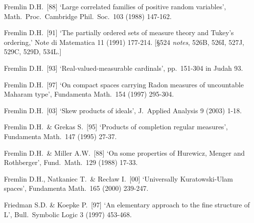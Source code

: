{Fremlin D.H.\ [88] `Large correlated families of positive
random variables',
Math.\ Proc.\ Cambridge Phil.\ Soc.\ 103 (1988) 147-162.
\cmmnt{[525S.]}

Fremlin D.H.\ [91] `The partially ordered sets of measure
theory and Tukey's ordering,' Note di Matematica  11 (1991) 177-214.
[\S524 {\it notes\/}, 526B, 526I, 527J, 529C, 529D, 534L.]

Fremlin D.H.\ [93] `Real-valued-measurable cardinals', pp.\ 151-304
in {\smc Judah 93}.

Fremlin D.H.\ [97] `On compact spaces carrying Radon measures of
uncountable Maharam type', Fundamenta Math.\  154 (1997) 295-304.
\cmmnt{[531T.]}


Fremlin D.H.\ [03] `Skew products of ideals',
J.\ Applied Analysis 9 (2003) 1-18.
\cmmnt{[\S527 {\it notes\/}.]}






Fremlin D.H.\ \& Grekas S.\ [95] `Products of completion regular
measures', Fundamenta Math.\ 147 (1995) 27-37.
\cmmnt{[532D.]}

Fremlin D.H.\ \& Miller A.W.\ [88]
`On some properties of Hurewicz, Menger and Rothberger',
Fund.\ Math.\ 129 (1988) 17-33.
\cmmnt{[534Q.]}

Fremlin D.H., Natkaniec T.\ \& Rec{\l}aw I.\ [00]
`Universally Kuratowski-Ulam spaces', Fundamenta Math.\ 165 (2000) 239-247.
\cmmnt{[\S527 {\it notes\/}.]}


Friedman S.D. \& Koepke P.\ [97] `An elementary approach to the fine
structure of L', Bull.\ Symbolic Logic 3 (1997) 453-468.
\cmmnt{[5A6D.]}

}
